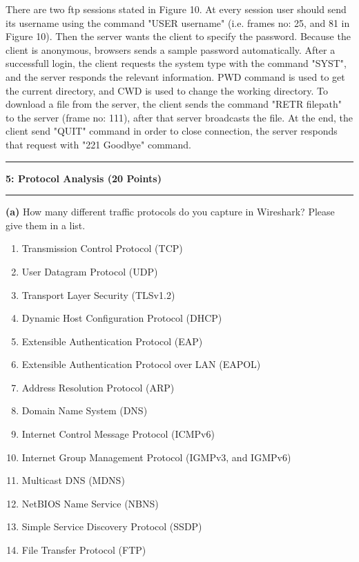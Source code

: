 \documentclass[11pt]{article}
\newcommand\question[2]{\vspace{.25in}\hrule\textbf{#1: #2}\vspace{.5em}\hrule\vspace{.10in}}
\renewcommand\part[1]{\vspace{.10in}\textbf{(#1)}}
\begin{document}
	There are two ftp sessions stated in Figure 10. At every session user should send its username using the command "USER username" (i.e. frames no: 25, and 81 in Figure 10). Then the server wants the client to specify the password. Because the client is anonymous, browsers sends a sample password automatically. After a successfull login, the client requests the system type with the command "SYST", and the server responds the relevant information. PWD command is used to get the current directory, and CWD is used to change the working directory. To download a file from the server, the client sends the command "RETR filepath" to the server (frame no: 111), after that server broadcasts the file. At the end, the client send "QUIT" command in order to close connection, the server responds that request with "221 Goodbye" command.  
	
	\clearpage
	
	\question{5}{Protocol Analysis (20 Points)}
	
	\part{a} How many different traffic protocols do you capture in Wireshark? Please give them in a list.

	\begin{enumerate}
		\item Transmission Control Protocol (TCP)
		\item User Datagram Protocol (UDP)
		\item Transport Layer Security (TLSv1.2)
		\item Dynamic Host Configuration Protocol (DHCP)
		\item Extensible Authentication Protocol (EAP)
		\item Extensible Authentication Protocol over LAN (EAPOL)
		\item Address Resolution Protocol (ARP)
		\item Domain Name System (DNS)
		\item Internet Control Message Protocol (ICMPv6)
		\item Internet Group Management Protocol (IGMPv3, and IGMPv6)
		\item Multicast DNS (MDNS)
		\item NetBIOS Name Service (NBNS)
		\item Simple Service Discovery Protocol (SSDP)
		\item File Transfer Protocol (FTP)
	\end{enumerate}
\end{document}
